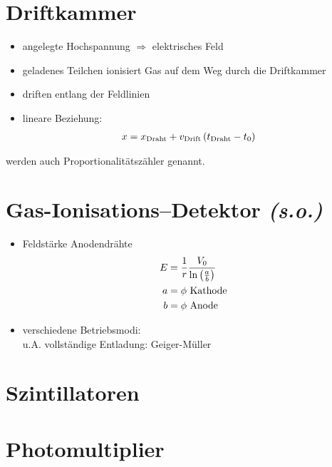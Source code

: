 \documentclass[BCOR=5mm,DIV=calc,listof=totoc,headings=big]{scrartcl}
\begin{document}
\section{Driftkammer}
\label{sec:driftkammer}
\begin{itemize}
\item angelegte Hochspannung $\Rightarrow$ elektrisches Feld
\item geladenes Teilchen ionisiert Gas auf dem Weg durch die Driftkammer
\item \Pelectron driften entlang der Feldlinien
\item lineare Beziehung:
  \begin{align*}
    x&=x_{\text{Draht}}+v_{\text{Drift}}\del{t_{\text{Draht}}-t_{0}}
  \end{align*}
\end{itemize}
werden auch Proportionalitätszähler genannt. 

\section{Gas-Ionisations--Detektor \emph{(s.o.)}}
\label{sec:gas-ionis-detekt}
\begin{itemize}
\item Feldstärke Anodendrähte
  \begin{align*}
    E&=\frac{1}{r} \frac{V_{0}}{\ln\del{\frac{a}{b}}}\\
    a&=\phi \text{ Kathode}\\
    b&=\phi \text{ Anode}
  \end{align*}
\item verschiedene Betriebsmodi:\\
  u.A. vollständige Entladung: Geiger-Müller
\end{itemize}

\section{Szintillatoren}
\label{sec:szintillatoren}

\section{Photomultiplier}
\label{sec:photomultiplier}
\end{document}
